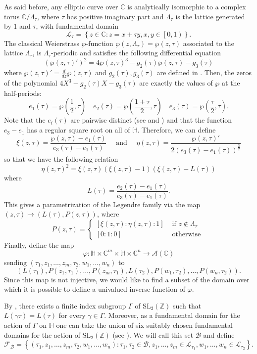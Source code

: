 \documentclass[11pt,a4paper,reqno]{amsart}
\numberwithin{equation}{section}
\newcommand{\Z}{\mathbb{Z}}
\newcommand{\C}{\mathbb{C}}
\newcommand{\f}{\varphi}
\newcommand{\pt}[1]{\left( #1 \right)}
\newcommand{\pg}[1]{\left\lbrace #1 \right\rbrace}
\theoremstyle{remark}
\theoremstyle{definition}
\theoremstyle{definition}
\begin{document}
As said before, any elliptic curve over $\C$ is analytically isomorphic to a complex torus $\C/\Lambda_{\tau}$, where $\tau$ has positive imaginary part and $\Lambda_{\tau}$ is the lattice generated by $1$ and $\tau$, with fundamental domain
$$\mathcal{L}_{\tau}=\pg{z\in \C: z=x+\tau y, x,y \in \left[0, 1\right)}.$$
The classical Weierstrass $\wp$-function $\wp(z,\Lambda_{\tau})=\wp(z,\tau)$ associated to the lattice $\Lambda_{\tau}$, is $\Lambda_{\tau}$-periodic and satisfies the following differential equation
$$ (\wp(z,\tau)')^2=4\wp(z,\tau)^3-g_2(\tau)\wp(z,\tau)-g_3(\tau) $$ 
where $\wp(z,\tau)'=\frac{d}{dz}\wp(z,\tau)$ and $g_2(\tau), g_3(\tau)$ are defined in \cite[Remark 3.5.1]{Sil09}. Then, the zeros of the polynomial $ 4X^3-g_2(\tau)X-g_3(\tau) $ are exactly the values of $ \wp $ at the half-periods:
$$ e_1(\tau)=\wp\left(\dfrac{1}{2},\tau \right) \quad e_2(\tau)=\wp\left(\dfrac{1+\tau}{2},\tau \right) \quad e_3(\tau)=\wp\left(\dfrac{\tau}{2},\tau \right).$$
Note that the $ e_i(\tau) $ are pairwise distinct (see \cite[Proposition VI.3.6]{Sil09} and \cite[Section 63]{For51}) and that the function $e_3-e_1$ has a regular square root on all of $\mathbb{H}$. Therefore, we can define 
$$ \xi(z,\tau)=\dfrac{\wp(z,\tau)-e_1(\tau)}{e_3(\tau)-e_1(\tau)} \quad \text{ and } \quad  \eta(z,\tau)=\dfrac{\wp(z,\tau)'}{2(e_3(\tau)-e_1(\tau))^{\frac{3}{2}}}$$
so that we have the following relation
$$ \eta(z,\tau)^2=\xi(z,\tau)(\xi(z,\tau)-1)(\xi(z,\tau)-L(\tau)) $$
where 
\begin{equation} \label{def_L}
L(\tau)=\dfrac{e_2(\tau)-e_1(\tau)}{e_3(\tau)-e_1(\tau)}.
\end{equation}
This gives a parametrization of the Legendre family via the map $ (z,\tau) \mapsto \left(L(\tau), P(z,\tau) \right)$, where
$$ P(z,\tau)=\begin{cases}
\left[\xi(z,\tau): \eta(z,\tau):1 \right] &\text{ if } z \not\in \Lambda_{\tau}\\
\left[0:1:0\right] &\text{ otherwise }
\end{cases} $$
Finally, define the map 
$$\f: \mathbb{H}\times \C^m\times \mathbb{H} \times \C^n \rightarrow \mathcal{A}(\C)$$
sending $\pt{\tau_1,z_1,\ldots, z_m, \tau_2, w_1, \ldots, w_n}$ to 
$$\pt{L(\tau_1), P(z_1,\tau_1), \ldots, P(z_m, \tau_1),L(\tau_2), P(w_1, \tau_2), \ldots, P(w_n,\tau_2)}.$$
Since this map is not injective, we would like to find a subset of the domain over which it is possible to define a univalued inverse function of $\f$.

By \cite[Section 70]{For51}, there exists a finite index subgroup $\Gamma$ of $\mathrm{SL}_2(\Z)$ such that $L(\gamma \tau)=L(\tau)$ for every $\gamma \in \Gamma$. Moreover, as a fundamental domain for the action of $\Gamma$ on $\mathbb{H}$ one can take the union of six suitably chosen fundamental domains for the action of $\mathrm{SL}_2(\Z)$ (see \cite[Figures 48 and 49]{For51}). We will call this set $\mathcal{B}$ and define
$$\mathcal{F}_{\mathcal{B}}=\pg{\pt{\tau_1,z_1,\ldots, z_m, \tau_2, w_1, \ldots, w_n}: \tau_1, \tau_2 \in \mathcal{B}, z_1, \ldots, z_m \in \mathcal{L}_{\tau_1}, w_1, \ldots, w_n \in \mathcal{L}_{\tau_2}}.$$
\end{document}
